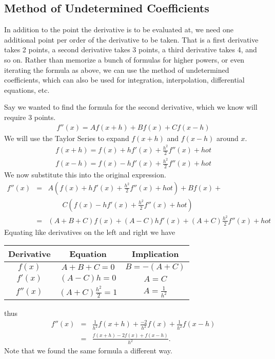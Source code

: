 \subsection{Method of Undetermined Coefficients}

In addition to the point the derivative is to be evaluated at, we need one additional point per order of the derivative to be taken.  That is a first derivative takes 2 points, a second derivative takes 3 points, a third derivative takes 4, and so on.  Rather than memorize a bunch of formulas for higher powers, or even iterating the formula as above, we can use the method of undetermined coefficients, which can also be used for integration, interpolation, differential equations, etc.

Say we wanted to find the formula for the second derivative, which we know will require 3 points.
\begin{eqnarray*}
f''(x)=Af(x+h)+Bf(x)+Cf(x-h)
\end{eqnarray*}
We will use the Taylor Series to expand $f(x+h)$ and $f(x-h)$ around $x$.
\begin{eqnarray*}
f(x+h)=f(x)+hf'(x)+\frac{h^2}{2}f''(x)+hot \\
f(x-h)=f(x)-hf'(x)+\frac{h^2}{2}f''(x)+hot
\end{eqnarray*}
We now substitute this into the original expression.
\begin{eqnarray*}
f''(x)
&=&A\left(f(x)+hf'(x)+\frac{h^2}{2}f''(x)+hot\right)+Bf(x)+ \\
&&\qquad C\left(f(x)-hf'(x)+\frac{h^2}{2}f''(x)+hot\right) \\
&=& (A+B+C)f(x)+(A-C)hf'(x)+(A+C)\frac{h^2}{2}f''(x)+hot
\end{eqnarray*}
Equating like derivatives on the left and right we have

\begin{tabular}{ccc}
Derivative & Equation               & Implication \\\hline
$f(x)$     & $A+B+C=0$              & $B=-(A+C)$ \\
$f'(x)$    & $(A-C)h=0$             & $A=C$ \\
$f''(x)$   & $(A+C)\frac{h^2}{2}=1$ & $A=\frac{1}{h^2}$ \\
\end{tabular}

thus
\begin{eqnarray*}
f''(x)&=&\frac{1}{h^2}f(x+h)+\frac{-2}{h^2}f(x)+\frac{1}{h^2}f(x-h)\\
      &=&\frac{f(x+h)-2f(x)+f(x-h)}{h^2}.
\end{eqnarray*}
Note that we found the same formula a different way.
